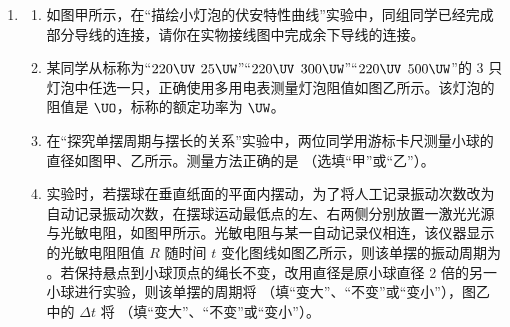 \documentclass[\gkver]{gaokaozhenti}
\begin{document}
\begin{enumerate}

{波速为 $1\Ums$}
{3 s 末 A、B 两质点的位移相同}
{1 s 末 A 点的振动速度大于 B 点的振动速度}


\item
\begin{enumerate}
	\item
	如图甲所示，在“描绘小灯泡的伏安特性曲线”实验中，同组同学已经完成部分导线的连接，请你在实物接线图中完成余下导线的连接。
	\item
	某同学从标称为“$220\UV$ $25\UW$”“$220\UV$ $300\UW$”“$220\UV$ $500\UW$”的 3 只灯泡中任选一只，正确使用多用电表测量灯泡阻值如图乙所示。该灯泡的阻值是 \tkanswer[1.6cm]{} $\UO$，标称的额定功率为 \tkanswer[1.6cm]{} $\UW$。
	\item
	在“探究单摆周期与摆长的关系”实验中，两位同学用游标卡尺测量小球的直径如图甲、乙所示。测量方法正确的是 \tkanswer[1.6cm]{}（选填“甲”或“乙”）。
	\item
	实验时，若摆球在垂直纸面的平面内摆动，为了将人工记录振动次数改为自动记录振动次数，在摆球运动最低点的左、右两侧分别放置一激光光源与光敏电阻，如图甲所示。光敏电阻与某一自动记录仪相连，该仪器显示的光敏电阻阻值 $R$ 随时间 $t$ 变化图线如图乙所示，则该单摆的振动周期为 \tkanswer[1.6cm]{}。若保持悬点到小球顶点的绳长不变，改用直径是原小球直径 2 倍的另一小球进行实验，则该单摆的周期将 \tkanswer[1.6cm]{}（填“变大”、“不变”或“变小”），图乙中的 $\Delta t$ 将 \tkanswer[1.6cm]{}（填“变大”、“不变”或“变小”）。
\end{enumerate}



\end{enumerate}
\end{document}
